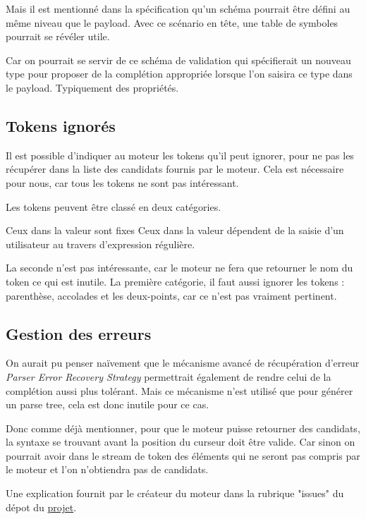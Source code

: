 \documentclass[
    iict, %
    il, %
]{heig-tb}
\begin{document}
Mais il est mentionné dans la spécification qu'un schéma pourrait être défini au même niveau que le payload.
Avec ce scénario en tête, une table de symboles pourrait se révéler utile.

Car on pourrait se servir de ce schéma de validation qui spécifierait un nouveau type pour proposer de la complétion appropriée
lorsque l'on saisira ce type dans le payload. Typiquement des propriétés.

\subsection{Tokens ignorés}

Il est possible d'indiquer au moteur les tokens qu'il peut ignorer, pour ne pas les récupérer dans la liste des candidats fournis par le moteur.
Cela est nécessaire pour nous, car tous les tokens ne sont pas intéressant.

Les tokens peuvent être classé en deux catégories.

Ceux dans la valeur sont fixes
Ceux dans la valeur dépendent de la saisie d'un utilisateur au travers d'expression régulière.

La seconde n'est pas intéressante, car le moteur ne fera que retourner le nom du token ce qui est inutile.
La première catégorie, il faut aussi ignorer les tokens : parenthèse, accolades et les deux-points, car ce n'est pas vraiment pertinent.

\subsection{Gestion des erreurs }\label{error handle}

On aurait pu penser naïvement que le mécanisme avancé de récupération d'erreur \emph{Parser Error Recovery Strategy} permettrait également de rendre celui de la complétion aussi plus tolérant.
Mais ce mécanisme n'est utilisé que pour générer un parse tree, cela est donc inutile pour ce cas. %

Donc comme déjà mentionner, pour que le moteur puisse retourner des candidats, la syntaxe se trouvant avant la position du curseur doit être valide.
Car sinon on pourrait avoir dans le stream de token des éléments qui ne seront pas compris par le moteur et l'on n’obtiendra pas de candidats.

Une explication fournit par le créateur du moteur dans la rubrique "issues" du dépot du \href{ https://github.com/mike-lischke/antlr4-c3/issues/29}{projet}.
\end{document}
